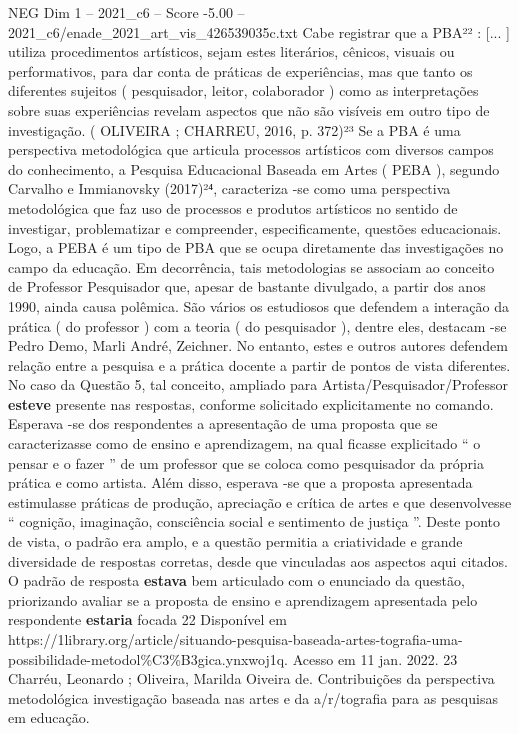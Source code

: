 \begin{textsample}{NEG Dim 1 – 2021\_c6 – Score -5.00 – 2021\_c6/enade\_2021\_art\_vis\_426539035c.txt}
Cabe registrar que a PBA²² : [... ] utiliza procedimentos artísticos, sejam estes literários, cênicos, visuais ou performativos, para dar conta de práticas de experiências, mas que tanto os diferentes sujeitos ( pesquisador, leitor, colaborador ) como as interpretações sobre suas experiências revelam aspectos que não são visíveis em outro tipo de investigação. ( OLIVEIRA ; CHARREU, 2016, p. 372)²³ Se a PBA é uma perspectiva metodológica que articula processos artísticos com diversos campos do conhecimento, a Pesquisa Educacional Baseada em Artes ( PEBA ), segundo Carvalho e Immianovsky (2017)²⁴, caracteriza -se como uma perspectiva metodológica que faz uso de processos e produtos artísticos no sentido de investigar, problematizar e compreender, especificamente, questões educacionais.
Logo, a PEBA é um tipo de PBA que se ocupa diretamente das investigações no campo da educação.
Em decorrência, tais metodologias se associam ao conceito de Professor Pesquisador que, apesar de bastante divulgado, a partir dos anos 1990, ainda causa polêmica.
São vários os estudiosos que defendem a interação da prática ( do professor ) com a teoria ( do pesquisador ), dentre eles, destacam -se Pedro Demo, Marli André, Zeichner.
No entanto, estes e outros autores defendem relação entre a pesquisa e a prática docente a partir de pontos de vista diferentes.
No caso da Questão 5, tal conceito, ampliado para Artista/Pesquisador/Professor \textbf{esteve} presente nas respostas, conforme solicitado explicitamente no comando.
Esperava -se dos respondentes a apresentação de uma proposta que se caracterizasse como de ensino e aprendizagem, na qual ficasse explicitado “ o pensar e o fazer ” de um professor que se coloca como pesquisador da própria prática e como artista.
Além disso, esperava -se que a proposta apresentada estimulasse práticas de produção, apreciação e crítica de artes e que desenvolvesse “ cognição, imaginação, consciência social e sentimento de justiça ”.
Deste ponto de vista, o padrão era amplo, e a questão permitia a criatividade e grande diversidade de respostas corretas, desde que vinculadas aos aspectos aqui citados.
O padrão de resposta \textbf{estava} bem articulado com o enunciado da questão, priorizando avaliar se a proposta de ensino e aprendizagem apresentada pelo respondente \textbf{estaria} focada 22 Disponível em https://1library.org/article/situando-pesquisa-baseada-artes-tografia-uma-possibilidade-metodol\%C3\%B3gica.ynxwoj1q.
Acesso em 11 jan. 2022. 23 Charréu, Leonardo ; Oliveira, Marilda Oiveira de.
Contribuições da perspectiva metodológica investigação baseada nas artes e da a/r/tografia para as pesquisas em educação.

\end{textsample}
